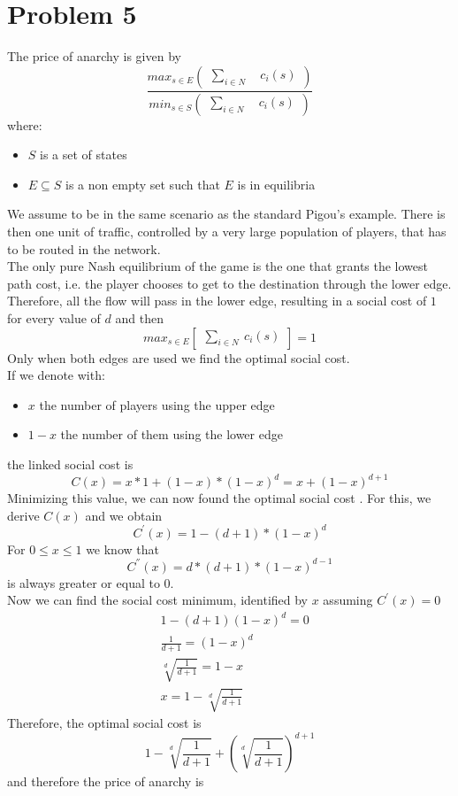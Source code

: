 \documentclass[a4paper,11pt]{article}
\begin{document}
\clearpage

\section{Problem 5}
The price of anarchy is given by 
$$\frac{max_{s\in E}( \begin{matrix} \sum_{i\in N} \quad c_i (s) \end{matrix})} {min_{s\in S} (\begin{matrix} \sum_{i\in N}  \quad c_i (s) \end{matrix})}$$
where:
\begin{itemize}
\item
$S$ is a set of states 
\item
$E \subseteq S$ is a non empty set such that $E$ is in equilibria
\end{itemize}
We assume to be in the same scenario as the standard Pigou's example. There is then one unit of traffic, controlled by a very large population of players, that has to be routed in the network.\\
The only pure Nash equilibrium of the game is the one that  grants the lowest path cost, i.e. the player chooses to get to the destination through the lower edge.
Therefore, all the flow will pass in the lower edge, resulting in a social cost of $1$ for every value of $d$ and then  $$max_{s\in E} \left[  \begin{matrix} \sum_{i\in N} \ c_i (s) \end{matrix}\right] = 1$$
Only when both edges are used we find the optimal social cost. \\ 
If we denote with:  
\begin{itemize}
\item
$x$ the number of players using the upper edge 
\item
$1-x$ the number of them using the lower edge
\end{itemize}
the linked social cost is
$$C(x) = x * 1 + (1-x) * (1 - x)^d = x + (1-x)^{d+1}$$
Minimizing this value, we can now found the optimal social cost . For this, we derive $C(x)$ and we obtain
$$C^{'} (x) = 1 - (d+1) * (1 - x)^d  $$
For $0 \le x \le 1$ we know that 
$$ C^{''} (x) =  d*(d+1) * (1 - x)^{d-1}  $$
is always greater or equal to 0. \\
Now we can find the social cost minimum, identified by $x$ assuming $C^{'} (x) = 0$
\begin{align*}
	&1 - (d+1)(1 - x)^d  = 0\\
	&\frac {1}{d+1} =  (1 - x)^d\\
	&\sqrt[d]{\frac {1}{d+1}} = 1-x\\
	&x = 1- \sqrt[d]{\frac {1}{d+1}}
\end{align*}
Therefore, the optimal social cost is 
$$ 1- \sqrt[d]{\frac {1}{d+1}} + \left( \sqrt[d]{\frac {1}{d+1}}\right) ^{d+1}$$
 and therefore the price of anarchy is
 
\end{document}
